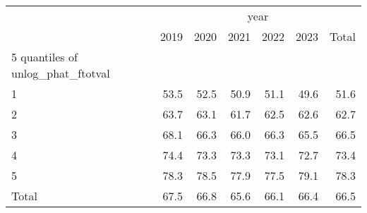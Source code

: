 \begin{tabular}{lllllll}
\cline{1-7}
\multicolumn{1}{c}{} &
  \multicolumn{6}{|c}{year} \\
\multicolumn{1}{c}{} &
  \multicolumn{1}{|r}{2019} &
  \multicolumn{1}{r}{2020} &
  \multicolumn{1}{r}{2021} &
  \multicolumn{1}{r}{2022} &
  \multicolumn{1}{r}{2023} &
  \multicolumn{1}{r}{Total} \\
\cline{1-7}
\multicolumn{1}{l}{5 quantiles of unlog\_phat\_ftotval} &
  \multicolumn{1}{|r}{} &
  \multicolumn{1}{r}{} &
  \multicolumn{1}{r}{} &
  \multicolumn{1}{r}{} &
  \multicolumn{1}{r}{} &
  \multicolumn{1}{r}{} \\
\multicolumn{1}{l}{\hspace{1em}1} &
  \multicolumn{1}{|r}{53.5} &
  \multicolumn{1}{r}{52.5} &
  \multicolumn{1}{r}{50.9} &
  \multicolumn{1}{r}{51.1} &
  \multicolumn{1}{r}{49.6} &
  \multicolumn{1}{r}{51.6} \\
\multicolumn{1}{l}{\hspace{1em}2} &
  \multicolumn{1}{|r}{63.7} &
  \multicolumn{1}{r}{63.1} &
  \multicolumn{1}{r}{61.7} &
  \multicolumn{1}{r}{62.5} &
  \multicolumn{1}{r}{62.6} &
  \multicolumn{1}{r}{62.7} \\
\multicolumn{1}{l}{\hspace{1em}3} &
  \multicolumn{1}{|r}{68.1} &
  \multicolumn{1}{r}{66.3} &
  \multicolumn{1}{r}{66.0} &
  \multicolumn{1}{r}{66.3} &
  \multicolumn{1}{r}{65.5} &
  \multicolumn{1}{r}{66.5} \\
\multicolumn{1}{l}{\hspace{1em}4} &
  \multicolumn{1}{|r}{74.4} &
  \multicolumn{1}{r}{73.3} &
  \multicolumn{1}{r}{73.3} &
  \multicolumn{1}{r}{73.1} &
  \multicolumn{1}{r}{72.7} &
  \multicolumn{1}{r}{73.4} \\
\multicolumn{1}{l}{\hspace{1em}5} &
  \multicolumn{1}{|r}{78.3} &
  \multicolumn{1}{r}{78.5} &
  \multicolumn{1}{r}{77.9} &
  \multicolumn{1}{r}{77.5} &
  \multicolumn{1}{r}{79.1} &
  \multicolumn{1}{r}{78.3} \\
\multicolumn{1}{l}{\hspace{1em}Total} &
  \multicolumn{1}{|r}{67.5} &
  \multicolumn{1}{r}{66.8} &
  \multicolumn{1}{r}{65.6} &
  \multicolumn{1}{r}{66.1} &
  \multicolumn{1}{r}{66.4} &
  \multicolumn{1}{r}{66.5} \\
\cline{1-7}
\end{tabular}
